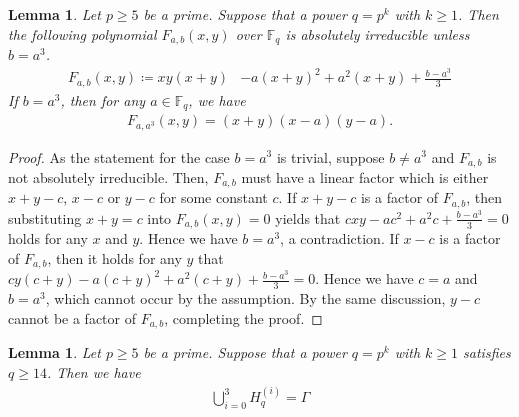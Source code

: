 \documentclass{amsart}
\newtheorem{lemma}[theorem]{Lemma}
\numberwithin{equation}{section}
\newcommand{\F}{\mathbb{F}}
\begin{document}
\begin{lemma}
\label{lem-abs}
Let $p \geq 5$ be a prime. Suppose that a power $q=p^k$ with $k\geq 1$. 
Then the following polynomial $F_{a,b}(x,y)$ over $\F_q$ is absolutely irreducible unless $b=a^3$.
    \begin{align*}
   F_{a,b}(x,y) \coloneq xy(x+y) &-a(x+y)^2+a^2(x+y)+\frac{b-a^3}{3}
\end{align*}
If $b=a^3$, then for any $a\in \F_q$, we have
\begin{align*}
    F_{a, a^3}(x,y)=(x+y)(x-a)(y-a).
\end{align*}
\end{lemma}

\begin{proof}
As the statement for the case $b=a^3$ is trivial, 
suppose $b \neq a^3$ and $F_{a,b}$ is not absolutely irreducible.
Then, $F_{a,b}$ must have a linear factor which is either $x+y-c$, $x-c$ or $y-c$ for some constant $c$. 
If $x+y-c$ is a factor of $F_{a,b}$, then substituting $x+y=c$ into $F_{a,b}(x,y)=0$ yields that $cxy-ac^2+a^2c+\frac{b-a^3}{3}=0$ holds for any $x$ and $y$. Hence we have $b=a^3$, a contradiction.
If $x-c$ is a factor of $F_{a,b}$, then it holds for any $y$ that
$cy(c+y)-a(c+y)^2+a^2(c+y)+\frac{b-a^3}{3}=0$.
Hence we have $c=a$ and $b=a^3$, which cannot occur by the assumption.
By the same discussion, $y-c$ cannot be a factor of $F_{a,b}$, completing the proof.
\end{proof}


\begin{lemma}
\label{lem-covering}
Let $p \geq 5$ be a prime. Suppose that a power $q=p^k$ with $k\geq 1$ satisfies $q\geq 14$.
Then we have 
\begin{align*}
    \bigcup_{i=0}^{3} H_q^{(i)}=\Gamma
\end{align*}
\end{lemma}
\end{document}
